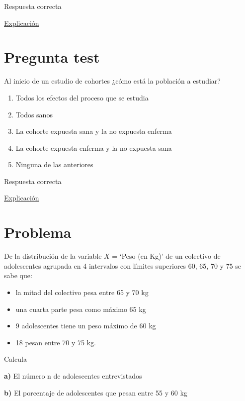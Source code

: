 \documentclass[
]{book}
\providecommand{\tightlist}{%
  \setlength{\itemsep}{0pt}\setlength{\parskip}{0pt}}
\begin{document}
Respuesta correcta

\href{https://1fjmanzano.github.io/bioestadistica/tipos-de-variables.html}{Explicación}

\hypertarget{pregunta-test-12}{%
\section{Pregunta test}\label{pregunta-test-12}}

Al inicio de un estudio de cohortes ¿cómo está la población a estudiar?

\begin{enumerate}
\def\labelenumi{\alph{enumi})}
\tightlist
\item
  Todos los efectos del proceso que se estudia
\item
  Todos sanos
\item
  La cohorte expuesta sana y la no expuesta enferma
\item
  La cohorte expuesta enferma y la no expuesta sana
\item
  Ninguna de las anteriores
\end{enumerate}

Respuesta correcta

\href{https://es.wikipedia.org/wiki/Estudio_de_cohorte}{Explicación}

\hypertarget{problema-1}{%
\section{Problema}\label{problema-1}}

De la distribución de la variable \(X\) = `Peso (en Kg)' de un colectivo de adolescentes agrupada en 4 intervalos con límites superiores 60, 65, 70 y 75 se sabe que:

\begin{itemize}
\tightlist
\item
  la mitad del colectivo pesa entre 65 y 70 kg
\item
  una cuarta parte pesa como máximo 65 kg
\item
  9 adolescentes tiene un peso máximo de 60 kg
\item
  18 pesan entre 70 y 75 kg.
\end{itemize}

Calcula

\textbf{a)} El número n de adolescentes entrevistados

\textbf{b)} El porcentaje de adolescentes que pesan entre 55 y 60 kg
\end{document}
